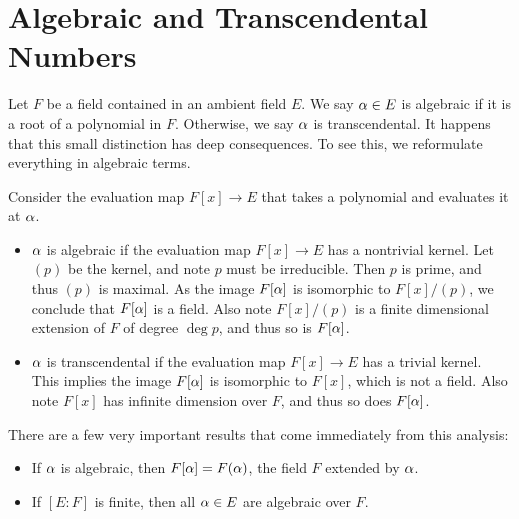 \section{Algebraic and Transcendental Numbers}
Let $F$ be a field contained in an ambient field $E$. We say $\alpha \in E$ is algebraic if it is a root of a polynomial in $F$. Otherwise, we say $\alpha$ is transcendental. It happens that this small distinction has deep consequences. To see this, we reformulate everything in algebraic terms.

Consider the evaluation map $F[x] \rightarrow E$ that takes a polynomial and evaluates it at $\alpha$.
\begin{itemize}
    \item $\alpha$ is algebraic if the evaluation map $F[x] \rightarrow E$ has a nontrivial kernel. Let $(p)$ be the kernel, and note $p$ must be irreducible. Then $p$ is prime, and thus $(p)$ is maximal. As the image $F[\alpha]$ is isomorphic to $F[x]/(p)$, we conclude that $F[\alpha]$ is a field. Also note $F[x]/(p)$ is a finite dimensional extension of $F$ of degree $\deg p$, and thus so is $F[\alpha]$.
    \item $\alpha$ is transcendental if the evaluation map $F[x] \rightarrow E$ has a trivial kernel. This implies the image $F[\alpha]$ is isomorphic to $F[x]$, which is not a field. Also note $F[x]$ has infinite dimension over $F$, and thus so does $F[\alpha]$.
\end{itemize}
There are a few very important results that come immediately from this analysis:
\begin{itemize}
    \item If $\alpha$ is algebraic, then $F[\alpha] = F(\alpha)$, the field $F$ extended by $\alpha$.
    \item If $[E : F]$ is finite, then all $\alpha \in E$ are algebraic over $F$.
\end{itemize}
